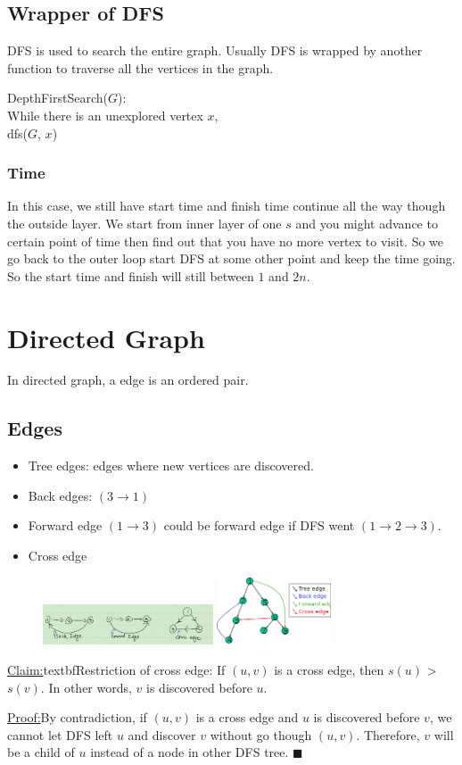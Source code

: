 \documentclass[en,hazy,blue,screen,14pt]{elegantnote}
\newcommand\tab[1][1cm]{\hspace*{#1}}
\newenvironment{claim}[1]{\par\noindent\underline{Claim:}\space#1}{}
\newenvironment{claimproof}[1]{\par\noindent\underline{Proof:}\space#1}{\hfill $\blacksquare$}
\begin{document}
\subsection{Wrapper of DFS}
DFS is used to search the entire graph. Usually DFS is wrapped by another 
function to traverse all the vertices in the graph.

DepthFirstSearch($G$):\\
\tab \tab While there is an unexplored vertex $x$,\\
\tab \tab \tab dfs($G$, $x$)

\subsubsection{Time}
In this case, we still have start time and finish time continue all the way 
though the outside layer. We start from inner layer of one $s$ and you might 
advance to certain point of time then find out that you have no more vertex to 
visit. So we go back to the outer loop start DFS at some other point and keep 
the time going. So the start time and finish will still between $1$ and $2n$.
\section{Directed Graph}
In directed graph, a edge is an ordered pair. 
\subsection{Edges}
\begin{itemize}
 \item Tree edges: edges where new vertices are discovered.
 \item Back edges: $(3 \rightarrow 1)$
 \item Forward edge $(1 \rightarrow 3)$ could be forward edge if DFS went $(1 
\rightarrow 2 \rightarrow 3)$.
 \item Cross edge
\end{itemize}

\begin{figure}[H]
\centering
\includegraphics[width=0.45\textwidth]{edges.png}
\includegraphics[width=0.3\textwidth]{edges-2.png}
\end{figure}
\begin{claim}
textbf{Restriction of cross edge:} If $(u, v)$ is a cross edge, then 
$s(u)$ > $s(v)$. In other words, $v$ is discovered before $u$.
\end{claim}
\begin{claimproof}
By contradiction, if $(u, v)$ is a cross edge and $u$ is discovered before $v$, 
we cannot let DFS left $u$ and discover $v$ without go though $(u, v)$. 
Therefore, $v$ will be a child of $u$ instead of a node in other DFS tree.
\end{claimproof}
\end{document}

